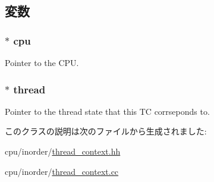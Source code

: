 \subsection{変数}
\hypertarget{classInOrderThreadContext_a41d682c28d0f49e04393c52815808782}{
\subsubsection[{cpu}]{$\ast$ {\bf cpu}}}
\label{classInOrderThreadContext_a41d682c28d0f49e04393c52815808782}
Pointer to the CPU. \hypertarget{classInOrderThreadContext_ac297691c06a1cd4769d8eba7822395b9}{
\subsubsection[{thread}]{$\ast$ {\bf thread}}}
\label{classInOrderThreadContext_ac297691c06a1cd4769d8eba7822395b9}
Pointer to the thread state that this TC corrseponds to. 

このクラスの説明は次のファイルから生成されました:\begin{DoxyCompactItemize}
\item 
cpu/inorder/\hyperlink{inorder_2thread__context_8hh}{thread\_\-context.hh}\item 
cpu/inorder/\hyperlink{inorder_2thread__context_8cc}{thread\_\-context.cc}\end{DoxyCompactItemize}
